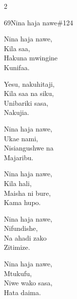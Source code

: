 \documentclass{article}
\begin{document}
\begin{multicols}{2}
\begin{hymn}{69}{Nina haja nawe}{\#124}
\begin{stanza}
Nina haja nawe,\\
Kila saa,\\
Hakuna mwingine\\
Kunifaa.
\end{stanza}
\begin{chorus}
Yesu, nakuhitaji,\\
Kila saa na siku,\\
Unibariki sasa,\\
Nakujia.
\end{chorus}
\begin{stanza}
Nina haja nawe,\\
Ukae nami,\\
Nisiangushwe na\\
Majaribu.
\end{stanza}
\begin{stanza}
Nina haja nawe,\\
Kila hali,\\
Maisha ni bure,\\
Kama hupo.
\end{stanza}
\begin{stanza}
Nina haja nawe,\\
Nifundishe,\\
Na ahadi zako\\
Zitimize.
\end{stanza}
\begin{stanza}
Nina haja nawe,\\
Mtukufu,\\
Niwe wako sasa,\\
Hata daima.
\end{stanza}
\end{hymn}


\end{multicols}
\end{document}
